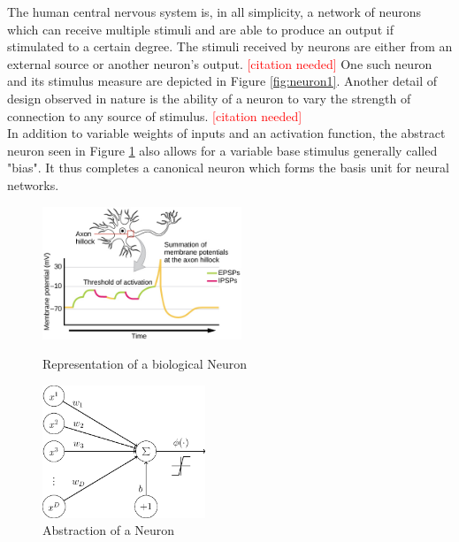 The human central nervous system is, in all simplicity, a network of neurons which can receive multiple stimuli and are able to produce an output if stimulated to a certain degree. The stimuli received by neurons are either from an external source or another neuron's output.
\textcolor{red}{[citation needed]}
One such neuron and its stimulus measure are depicted in Figure \ref{fig:neuron1}. Another detail of design observed in nature is the ability of a neuron to vary the strength of connection to any source of stimulus. 
\textcolor{red}{[citation needed]}\\
In addition to variable weights of inputs and an activation function, the abstract neuron
seen in Figure \ref{fig:neuron2} also allows for a variable base stimulus generally called "bias". It thus completes a canonical neuron which forms the basis unit for neural networks.\\

\begin{figure}
	\centering
	\begin{minipage}{0.45\textwidth}
		\centering
		\includegraphics[height=150px]{gfx/Biological_Neuron.jpg}
		\caption{Representation of a biological Neuron}
		\label{fig:neuron1}
	\end{minipage}\hfill
	\begin{minipage}{0.45\textwidth}
		\centering
		\includegraphics[height=150px]{gfx/Abstract_Neuron.png}
		\caption{Abstraction of a Neuron}
		\label{fig:neuron2}
	\end{minipage}
\end{figure}

